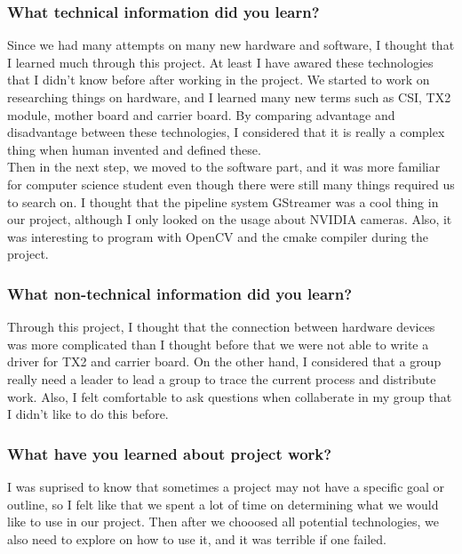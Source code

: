 \subsubsection{What technical information did you learn?}
Since we had many attempts on many new hardware and software, I thought that I learned much through 
this project. At least I have awared these technologies that I didn't know before after working in the
 project. We started to work on researching things on hardware, and I learned many new terms such as 
 CSI, TX2 module, mother board and carrier board. By comparing advantage and disadvantage between these 
 technologies, I considered that it is really a complex thing when human invented and defined these. \\

 Then in the next step, we moved to the software part, and it was more familiar for computer science 
 student even though there were still many things required us to search on. I thought that the pipeline 
 system GStreamer was a cool thing in our project, although I only looked on the usage about NVIDIA cameras. 
 Also, it was interesting to program with OpenCV and the cmake compiler during the project. \\

\subsubsection{What non-technical information did you learn?}
Through this project, I thought that the connection between hardware devices was more complicated than
 I thought before that we were not able to write a driver for TX2 and carrier board. On the other hand, 
 I considered that a group really need a leader to lead a group to trace the current process and 
 distribute work. Also, I felt comfortable to ask questions when collaberate in my group that I didn't 
 like to do this before. \\

\subsubsection{What have you learned about project work?}
I was suprised to know that sometimes a project may not have a specific goal or outline, so I felt like 
that we spent a lot of time on determining what we would like to use in our project. Then after we 
chooosed all potential technologies, we also need to explore on how to use it, and it was terrible 
if one failed. \\

